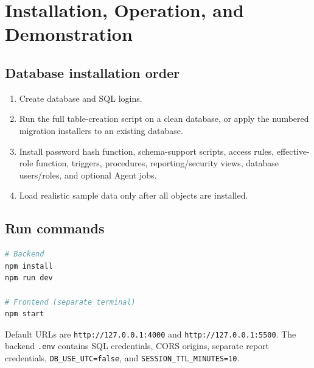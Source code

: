 \documentclass[11pt,a4paper,oneside]{report}
\begin{document}
\chapter{Installation, Operation, and Demonstration}
\section{Database installation order}
\begin{enumerate}
\item Create database and SQL logins.
\item Run the full table-creation script on a clean database, or apply the numbered migration installers to an existing database.
\item Install password hash function, schema-support scripts, access rules, effective-role function, triggers, procedures, reporting/security views, database users/roles, and optional Agent jobs.
\item Load realistic sample data only after all objects are installed.
\end{enumerate}

\section{Run commands}
\begin{lstlisting}[language=Bash]
# Backend
npm install
npm run dev

# Frontend (separate terminal)
npm start
\end{lstlisting}
Default URLs are \texttt{http://127.0.0.1:4000} and \texttt{http://127.0.0.1:5500}. The backend \texttt{.env} contains SQL credentials, CORS origins, separate report credentials, \texttt{DB\_USE\_UTC=false}, and \texttt{SESSION\_TTL\_MINUTES=10}.
\end{document}
